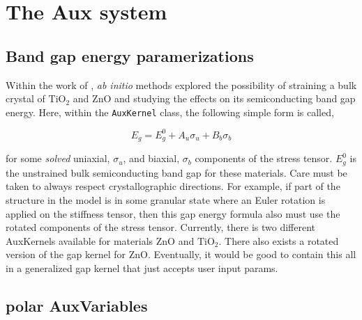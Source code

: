 \documentclass[16pt]{article} %
\begin{document}
\newpage



\section{The Aux system}

\subsection{Band gap energy paramerizations}

Within the work of \cite{Yin2010, Wagner2013}, \emph{ab initio} methods explored the possibility of straining a bulk crystal of $\mathrm{TiO}_2$ and $\mathrm{ZnO}$ and studying the effects on its semiconducting band gap energy. Here, within the \texttt{AuxKernel} class, the following simple form is called,

$$ E_g = E_g^0 + A_u \sigma_u + B_b \sigma_b$$

for some \emph{solved} uniaxial, $\sigma_u$, and biaxial, $\sigma_b$ components of the stress tensor.
%
$E_g^0$ is the unstrained bulk semiconducting band gap for these materials.
%
Care must be taken to always respect crystallographic directions.
%
For example, if part of the structure in the model is in some granular state where an Euler rotation is applied on the stiffness tensor, then this gap energy formula also must use the rotated components of the stress tensor.
%
Currently, there is two different AuxKernels available for materials $\mathrm{ZnO}$ and $\mathrm{TiO}_2$.
%
There also exists a rotated version of the gap kernel for $\mathrm{ZnO}$.
%
Eventually, it would be good to contain this all in a generalized gap kernel that just accepts user input params.
%
%
\subsection{polar AuxVariables}
%
\end{document}
